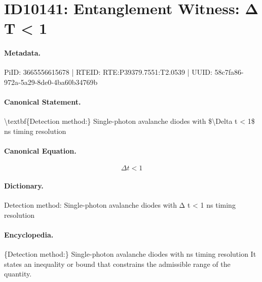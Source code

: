 \section*{ID10141: Entanglement Witness: Δ T < 1}
\paragraph{Metadata.}
PiID: 3665556615678 | RTEID: RTE:P39379.7551:T2.0539 | UUID: 58c7fa86-972a-5a29-8de0-4ba60b34769b

\paragraph{Canonical Statement.}
\textbackslash{}textbf\{Detection method:\} Single-photon avalanche diodes with \$\textbackslash{}Delta t < 1\$ ns timing resolution

\paragraph{Canonical Equation.}
\[
\Delta t < 1
\]

\paragraph{Dictionary.}
Detection method: Single-photon avalanche diodes with Δ t < 1 ns timing resolution

\paragraph{Encyclopedia.}
\{Detection method:\} Single-photon avalanche diodes with ns timing resolution It states an inequality or bound that constrains the admissible range of the quantity.
